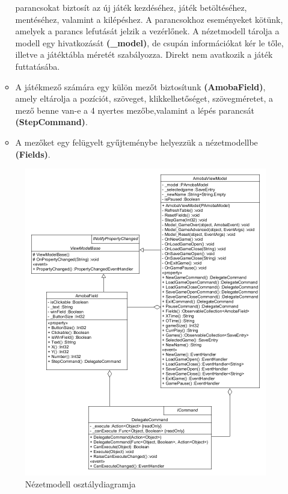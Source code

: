 \documentclass[11pt,a4paper]{article}
\begin{document}
\begin{itemize}
\begin{itemize}
		parancsokat biztosít az új játék kezdéséhez, játék betöltéséhez,
		mentéséhez, valamint a kilépéshez. A parancsokhoz eseményeket kötünk,
		amelyek a parancs lefutását jelzik a vezérlőnek. A nézetmodell tárolja a
		modell egy hivatkozását \textbf{(\_model)}, de csupán információkat kér le tőle,
		illetve a játéktábla méretét szabályozza. Direkt nem avatkozik a játék
		futtatásába.
		\item A játékmező számára egy külön mezőt biztosítunk \textbf{(AmobaField)}, amely
		eltárolja a pozíciót, szöveget, klikkelhetőséget, szövegméretet, a mező benne van-e a
		4 nyertes mezőbe,\br valamint a lépés parancsát \textbf{(StepCommand)}.
		\item A mezőket egy felügyelt gyűjteménybe helyezzük a nézetmodellbe \textbf{(Fields)}.
	\end{itemize}
	\begin{figure}[h]
		\centering
		\includegraphics[width=18cm]{UMLs/ViewModell.png}
		\caption{Nézetmodell osztálydiagramja}
	\end{figure}

\end{itemize}
\end{document}
